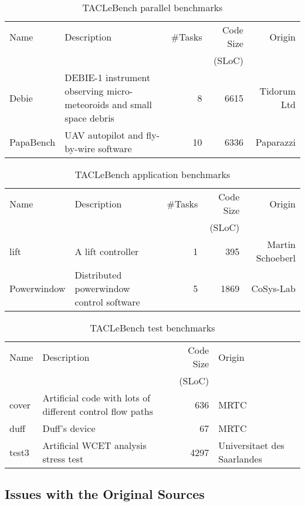 \documentclass[a4paper,UKenglish]{oasics}
\begin{document}
\begin{table}
\centering
\caption{\label{tab:bench_parallel}TACLeBench parallel benchmarks}  
\begin{tabular}{lp{5cm}rrr}
\toprule
Name & Description & \#Tasks &Code Size & Origin\\
     &             &         &(SLoC) & \\ \midrule
Debie&  DEBIE-1 instrument observing micro-meteoroids and small space debris &8 &  6615 & Tidorum Ltd \\
PapaBench &  UAV autopilot and fly-by-wire software & 10 & 6336 & Paparazzi \\
\bottomrule
\end{tabular}
\end{table}

\begin{table}
\centering
\caption{\label{tab:bench_app}TACLeBench application benchmarks}  
\begin{tabular}{lp{5cm}rrr}
\toprule
Name & Description & \#Tasks & Code Size & Origin\\

     &             &         &     (SLoC) & \\ \midrule
lift & A lift controller & 1 & 395 & Martin Schoeberl\\
Powerwindow & Distributed powerwindow control software & 5 & 1869 & CoSys-Lab \\
\bottomrule
\end{tabular}
\end{table}

\begin{table}
\centering
\caption{\label{tab:bench_test}TACLeBench test benchmarks}  
\begin{tabular}{lp{5cm}rp{2.5cm}}
\toprule
Name & Description & Code Size & Origin\\
     &             &  (SLoC) & \\ \midrule
cover &  Artificial code with lots of different control flow paths  & 636  & MRTC \\
duff & Duff's device  & 67 & MRTC \\
test3 &  Artificial WCET analysis stress test & 4297 & Universitaet des Saarlandes \\
\bottomrule
\end{tabular}
\end{table}




\subsection{Issues with the Original Sources}
\end{document}
